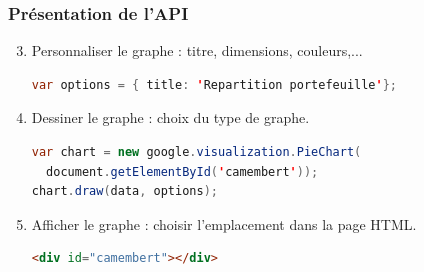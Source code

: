 \begin{frame} [fragile]
    \frametitle{Présentation de l'API}
    \begin{enumerate}
     \setcounter{enumi}{2}
     \item Personnaliser le graphe : titre, dimensions, couleurs,...
\begin{lstlisting}[language=JAVA, basicstyle=\scriptsize]      
var options = { title: 'Repartition portefeuille'};
\end{lstlisting}    
     \item Dessiner le graphe : choix du type de graphe.
\begin{lstlisting}[language=JAVA, basicstyle=\scriptsize]      
var chart = new google.visualization.PieChart(
  document.getElementById('camembert'));
chart.draw(data, options);
\end{lstlisting}    
     \item Afficher le graphe : choisir l'emplacement dans la page HTML.
\begin{lstlisting}[language=HTML, basicstyle=\scriptsize]      
<div id="camembert"></div>
\end{lstlisting}    
    \end{enumerate}
\end{frame}